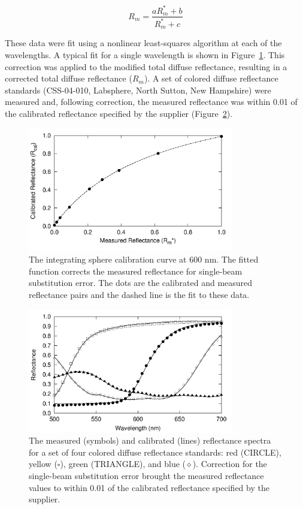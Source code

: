 \begin{equation}
\label{eq:sbse}
	R_m = \frac{aR_m^\ast + b}{R_m^\ast + c}
\end{equation}

These data were fit using a nonlinear least-squares algorithm at each of the wavelengths. A typical fit for a single wavelength is shown in Figure~\ref{fig:p1-sbse_cf}. This correction was applied to the modified total diffuse reflectance, resulting in a corrected total diffuse reflectance ($R_m$). A set of colored diffuse reflectance standards (CSS-04-010, Labsphere, North Sutton, New Hampshire) were measured and, following correction, the measured reflectance was within 0.01 of the calibrated reflectance specified by the supplier (Figure~\ref{fig:p1-colored_refl}).

\begin{figure}
	\centering \includegraphics[width=0.8\textwidth]{figures/p1-sbse_cf.png}
	\caption[Single-beam substitution error correction curve text]{\label{fig:p1-sbse_cf}The integrating sphere calibration curve at 600 nm. The fitted function corrects the measured reflectance for single-beam substitution error. The dots are the calibrated and measured reflectance pairs and the dashed line is the fit to these data.}
\end{figure}

\begin{figure}
	\centering \includegraphics[width=0.8\textwidth]{figures/p1-colored_refl.png}
	\caption[Measured and calibrated reflectance spectra]{\label{fig:p1-colored_refl}The measured (symbols) and calibrated (lines) reflectance spectra for a set of four colored diffuse reflectance standards: red (CIRCLE), yellow ($\square$), green (TRIANGLE), and blue ($\diamond$). Correction for the single-beam substitution error brought the measured reflectance values to within 0.01 of the calibrated reflectance specified by the supplier.}
\end{figure}


